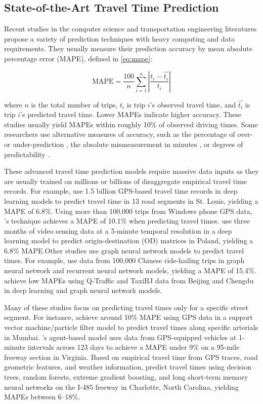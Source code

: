 \documentclass[12pt,letterpaper]{article} %
\begin{document}
\subsection{State-of-the-Art Travel Time Prediction}

Recent studies in the computer science and transportation engineering literatures propose a variety of prediction techniques with heavy computing and data requirements. They usually measure their prediction accuracy by mean absolute percentage error (MAPE), defined in \autoref{eq:mape}:

\begin{equation}
\label{eq:mape}
\text{MAPE} = \frac{100}{n} \sum^{n}_{i=1} \left|\frac{t_i - \hat{t_i}}{t_i}\right|
\end{equation}

where $n$ is the total number of trips, $t_i$ is trip $i$'s observed travel time, and $\hat{t_i}$ is trip $i$'s predicted travel time. Lower MAPEs indicate higher accuracy.  These studies usually yield MAPEs within roughly 10\% of observed driving times. Some researchers use alternative measures of accuracy, such as the percentage of over- or under-prediction \citep{jenelius2013travel}, the absolute mismeasurement in minutes \citep{chiabaut2021traffic}, or degrees of predictability \citep{li2019travel}.

These advanced travel time prediction models require massive data inputs as they are usually trained on millions or billions of disaggregate empirical travel time records. For example, \citet{hou2018network} use 1.5 billion GPS-based travel time records in deep learning models to predict travel time in 13 road segments in St. Louis, yielding a MAPE of 6.8\%. Using more than 100,000 trips from Windows phone GPS data, \citet{woodard2017predicting}'s technique achieves a MAPE of 10.1\% when predicting travel times. \citet{pamula2023estimation} use three months of video sensing data at a 5-minute temporal resolution in a deep learning model to predict origin-destination (OD) matrices in Poland, yielding a 6.8\% MAPE.\@ Other studies use graph neural network models to predict travel times. For example, \citet{wang2023dynamic} use data from 100,000 Chinese ride-hailing trips in graph neural network and recurrent neural network models, yielding a MAPE of 15.4\%. \citet{vankdoth2023deep} achieve low MAPEs using Q-Traffic and TaxiBJ data from Beijing and Chengdu in deep learning and graph neural network models.

Many of these studies focus on predicting travel times only for a specific street segment. For instance, \citet{sharmila2019svm} achieve around 10\% MAPE using GPS data in a support vector machine/particle filter model to predict travel times along specific arterials in Mumbai. \citet{chen2016multi}'s agent-based model uses data from GPS-equipped vehicles at 1-minute intervals across 123 days to achieve a MAPE under 9\% on a 95-mile freeway section in Virginia. Based on empirical travel time from GPS traces, road geometric features, and weather information, \citet{qiu2021machine} predict travel times using decision trees, random forests, extreme gradient boosting, and long short-term memory neural networks on the I-485 freeway in Charlotte, North Carolina, yielding MAPEs between 6--18\%.
\end{document}
